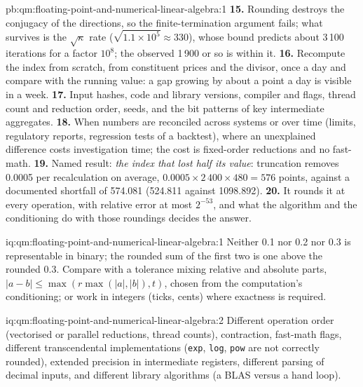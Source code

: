 \begin{solution}{pb:qm:floating-point-and-numerical-linear-algebra:1}
\textbf{15.} Rounding destroys the conjugacy of the directions, so the finite-termination argument fails; what survives is the $\sqrt\kappa$ rate ($\sqrt{1.1 \times 10^5} \approx 330$), whose bound
predicts about 3\,100 iterations for a factor $10^8$; the observed 1\,900 or so is within it.
\textbf{16.} Recompute the index from scratch, from constituent prices and the divisor, once a day and compare with the running value: a gap growing by about a point a day is visible in a week.
\textbf{17.} Input hashes, code and library versions, compiler and flags, thread count and reduction order, seeds, and the bit patterns of key intermediate aggregates.
\textbf{18.} When numbers are reconciled across systems or over time (limits, regulatory reports, regression tests of a backtest), where an unexplained difference costs investigation time; the cost is
fixed-order reductions and no fast-math.
\textbf{19.} Named result: \emph{the index that lost half its value}: truncation removes 0.0005 per recalculation on average, $0.0005 \times 2\,400 \times 480 = 576$ points, against a documented
shortfall of 574.081 (524.811 against 1098.892).
\textbf{20.} It rounds it at every operation, with relative error at most $2^{-53}$, and what the algorithm and the conditioning do with those roundings decides the answer.
\end{solution}

\begin{solution}{iq:qm:floating-point-and-numerical-linear-algebra:1}
Neither 0.1 nor 0.2 nor 0.3 is representable in binary; the rounded sum of the first two is one  above the rounded 0.3. Compare with a tolerance mixing relative and absolute
parts, $|a - b| \le \max(r\max(|a|, |b|), t)$, chosen from the computation's conditioning; or work in integers (ticks, cents) where exactness is required.
\end{solution}

\begin{solution}{iq:qm:floating-point-and-numerical-linear-algebra:2}
Different operation order (vectorised or parallel reductions, thread counts),  contraction, fast-math flags, different transcendental implementations (\texttt{exp}, \texttt{log},
\texttt{pow} are not correctly rounded), extended precision in intermediate registers, different parsing of decimal inputs, and different library algorithms (a BLAS versus a hand loop).
\end{solution}

